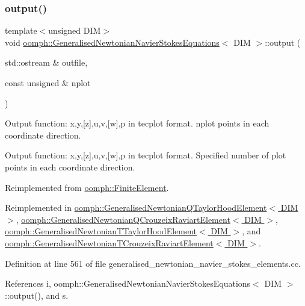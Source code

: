 \subsubsection{\texorpdfstring{output()}{output()}\hspace{0.1cm}{\footnotesize\ttfamily [2/4]}}
{\footnotesize\ttfamily template$<$unsigned D\+IM$>$ \\
void \hyperlink{classoomph_1_1GeneralisedNewtonianNavierStokesEquations}{oomph\+::\+Generalised\+Newtonian\+Navier\+Stokes\+Equations}$<$ D\+IM $>$\+::output (\begin{DoxyParamCaption}\item[{std\+::ostream \&}]{outfile,  }\item[{const unsigned \&}]{nplot }\end{DoxyParamCaption})\hspace{0.3cm}{\ttfamily [virtual]}}



Output function\+: x,y,\mbox{[}z\mbox{]},u,v,\mbox{[}w\mbox{]},p in tecplot format. nplot points in each coordinate direction. 

Output function\+: x,y,\mbox{[}z\mbox{]},u,v,\mbox{[}w\mbox{]},p in tecplot format. Specified number of plot points in each coordinate direction. 

Reimplemented from \hyperlink{classoomph_1_1FiniteElement_afa9d9b2670f999b43e6679c9dd28c457}{oomph\+::\+Finite\+Element}.



Reimplemented in \hyperlink{classoomph_1_1GeneralisedNewtonianQTaylorHoodElement_ad6972349bba7af653113c45a127ae5f0}{oomph\+::\+Generalised\+Newtonian\+Q\+Taylor\+Hood\+Element$<$ D\+I\+M $>$}, \hyperlink{classoomph_1_1GeneralisedNewtonianQCrouzeixRaviartElement_a8479877ac6783559f319414c38245543}{oomph\+::\+Generalised\+Newtonian\+Q\+Crouzeix\+Raviart\+Element$<$ D\+I\+M $>$}, \hyperlink{classoomph_1_1GeneralisedNewtonianTTaylorHoodElement_a2c0b32513bf821e1b86efecfceaf2b08}{oomph\+::\+Generalised\+Newtonian\+T\+Taylor\+Hood\+Element$<$ D\+I\+M $>$}, and \hyperlink{classoomph_1_1GeneralisedNewtonianTCrouzeixRaviartElement_a56bdad45189809ed1a288727e63fdb7e}{oomph\+::\+Generalised\+Newtonian\+T\+Crouzeix\+Raviart\+Element$<$ D\+I\+M $>$}.



Definition at line 561 of file generalised\+\_\+newtonian\+\_\+navier\+\_\+stokes\+\_\+elements.\+cc.



References i, oomph\+::\+Generalised\+Newtonian\+Navier\+Stokes\+Equations$<$ D\+I\+M $>$\+::output(), and s.

